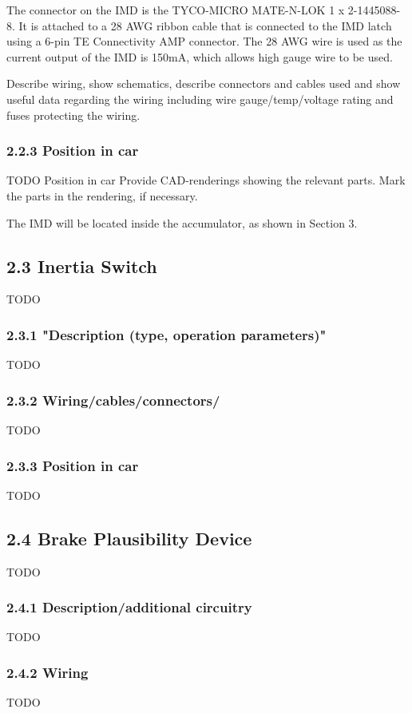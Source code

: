 \documentclass{article}
\begin{document}
The connector on the IMD is the TYCO-MICRO MATE-N-LOK 1 x 2-1445088-8. It is attached to a 28 AWG ribbon cable that is connected to the IMD latch using a 6-pin TE Connectivity AMP connector. The 28 AWG wire is used as the current output of the IMD is 150mA, which allows high gauge wire to be used.

Describe wiring, show schematics, describe connectors and cables used and show useful data regarding the wiring including wire gauge/temp/voltage rating and fuses protecting the wiring.

\subsubsection*{2.2.3 Position in car}
TODO
Position in car
Provide CAD-renderings showing the relevant parts. Mark the parts in the rendering, if necessary.

The IMD will be located inside the accumulator, as shown in Section 3.

\subsection*{2.3 Inertia Switch}
TODO

\subsubsection*{2.3.1 "Description (type, operation parameters)"}
TODO

\subsubsection*{2.3.2 Wiring/cables/connectors/}
TODO

\subsubsection*{2.3.3 Position in car}
TODO

\subsection*{2.4 Brake Plausibility Device}
TODO

\subsubsection*{2.4.1 Description/additional circuitry}
TODO

\subsubsection*{2.4.2 Wiring}
TODO
\end{document}
